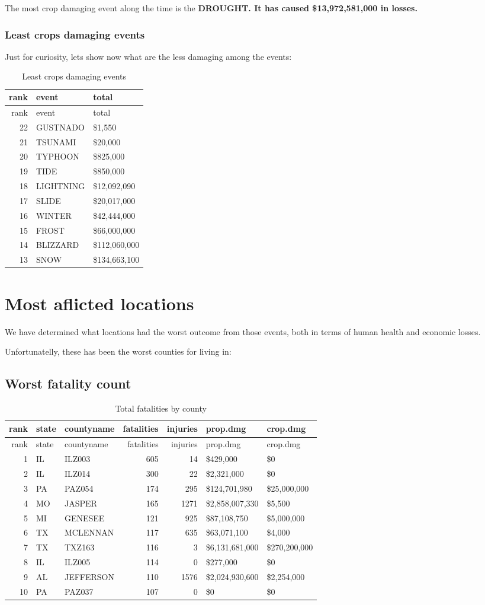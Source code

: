 The most crop damaging event along the time is the \textbf{DROUGHT. It
has caused \$13,972,581,000 in losses.}

\subsubsection{Least crops damaging
events}\label{least-crops-damaging-events}

Just for curiosity, lets show now what are the less damaging among the
events:

\begin{longtable}[]{@{}rll@{}}
\caption{Least crops damaging events}\tabularnewline
\toprule
rank & event & total\tabularnewline
\midrule
\endfirsthead
\toprule
rank & event & total\tabularnewline
\midrule
\endhead
22 & GUSTNADO & \$1,550\tabularnewline
21 & TSUNAMI & \$20,000\tabularnewline
20 & TYPHOON & \$825,000\tabularnewline
19 & TIDE & \$850,000\tabularnewline
18 & LIGHTNING & \$12,092,090\tabularnewline
17 & SLIDE & \$20,017,000\tabularnewline
16 & WINTER & \$42,444,000\tabularnewline
15 & FROST & \$66,000,000\tabularnewline
14 & BLIZZARD & \$112,060,000\tabularnewline
13 & SNOW & \$134,663,100\tabularnewline
\bottomrule
\end{longtable}

\section{Most aflicted locations}\label{most-aflicted-locations}

We have determined what locations had the worst outcome from those
events, both in terms of human health and economic losses.

Unfortunatelly, these has been the worst counties for living in:

\subsection{Worst fatality count}\label{worst-fatality-count}

\begin{longtable}[]{@{}rllrrll@{}}
\caption{Total fatalities by county}\tabularnewline
\toprule
rank & state & countyname & fatalities & injuries & prop.dmg &
crop.dmg\tabularnewline
\midrule
\endfirsthead
\toprule
rank & state & countyname & fatalities & injuries & prop.dmg &
crop.dmg\tabularnewline
\midrule
\endhead
1 & IL & ILZ003 & 605 & 14 & \$429,000 & \$0\tabularnewline
2 & IL & ILZ014 & 300 & 22 & \$2,321,000 & \$0\tabularnewline
3 & PA & PAZ054 & 174 & 295 & \$124,701,980 &
\$25,000,000\tabularnewline
4 & MO & JASPER & 165 & 1271 & \$2,858,007,330 & \$5,500\tabularnewline
5 & MI & GENESEE & 121 & 925 & \$87,108,750 & \$5,000,000\tabularnewline
6 & TX & MCLENNAN & 117 & 635 & \$63,071,100 & \$4,000\tabularnewline
7 & TX & TXZ163 & 116 & 3 & \$6,131,681,000 &
\$270,200,000\tabularnewline
8 & IL & ILZ005 & 114 & 0 & \$277,000 & \$0\tabularnewline
9 & AL & JEFFERSON & 110 & 1576 & \$2,024,930,600 &
\$2,254,000\tabularnewline
10 & PA & PAZ037 & 107 & 0 & \$0 & \$0\tabularnewline
\bottomrule
\end{longtable}

